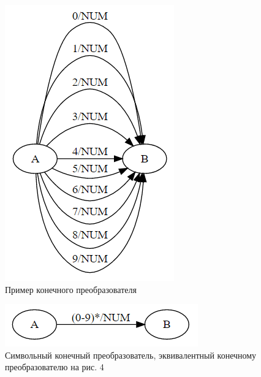 \begin{figure}[h!]
    \begin{center}
        \includegraphics[width=\linewidth/3]{Gumin/pictures/NumFST.png}
        \caption{Пример конечного преобразователя}
        \label{fig:numfst} 
    \end{center}
\end{figure}

\begin{figure}[h!]
    \begin{center}
        \includegraphics[width=\linewidth/2]{Gumin/pictures/NumST.png}
        \caption{Символьный конечный преобразователь, эквивалентный конечному преобразователю на рис. 4}
        \label{fig:numst} 
    \end{center}
\end{figure}

